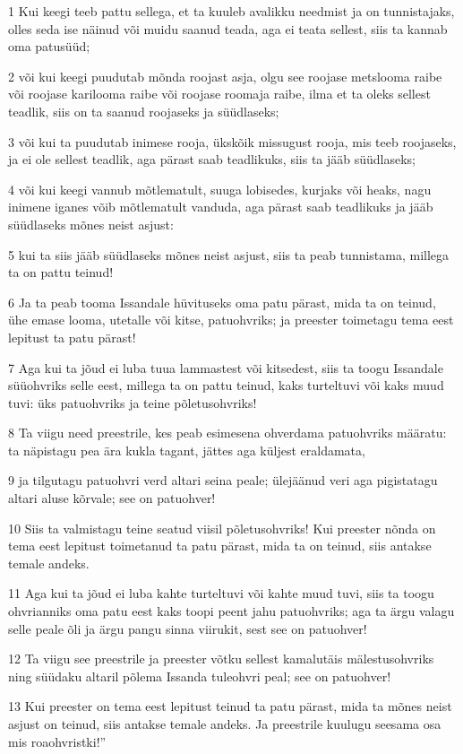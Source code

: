 \par 1 Kui keegi teeb pattu sellega, et ta kuuleb avalikku needmist ja on tunnistajaks, olles seda ise näinud või muidu saanud teada, aga ei teata sellest, siis ta kannab oma patusüüd;
\par 2 või kui keegi puudutab mõnda roojast asja, olgu see roojase metslooma raibe või roojase karilooma raibe või roojase roomaja raibe, ilma et ta oleks sellest teadlik, siis on ta saanud roojaseks ja süüdlaseks;
\par 3 või kui ta puudutab inimese rooja, ükskõik missugust rooja, mis teeb roojaseks, ja ei ole sellest teadlik, aga pärast saab teadlikuks, siis ta jääb süüdlaseks;
\par 4 või kui keegi vannub mõtlematult, suuga lobisedes, kurjaks või heaks, nagu inimene iganes võib mõtlematult vanduda, aga pärast saab teadlikuks ja jääb süüdlaseks mõnes neist asjust:
\par 5 kui ta siis jääb süüdlaseks mõnes neist asjust, siis ta peab tunnistama, millega ta on pattu teinud!
\par 6 Ja ta peab tooma Issandale hüvituseks oma patu pärast, mida ta on teinud, ühe emase looma, utetalle või kitse, patuohvriks; ja preester toimetagu tema eest lepitust ta patu pärast!
\par 7 Aga kui ta jõud ei luba tuua lammastest või kitsedest, siis ta toogu Issandale süüohvriks selle eest, millega ta on pattu teinud, kaks turteltuvi või kaks muud tuvi: üks patuohvriks ja teine põletusohvriks!
\par 8 Ta viigu need preestrile, kes peab esimesena ohverdama patuohvriks määratu: ta näpistagu pea ära kukla tagant, jättes aga küljest eraldamata,
\par 9 ja tilgutagu patuohvri verd altari seina peale; ülejäänud veri aga pigistatagu altari aluse kõrvale; see on patuohver!
\par 10 Siis ta valmistagu teine seatud viisil põletusohvriks! Kui preester nõnda on tema eest lepitust toimetanud ta patu pärast, mida ta on teinud, siis antakse temale andeks.
\par 11 Aga kui ta jõud ei luba kahte turteltuvi või kahte muud tuvi, siis ta toogu ohvrianniks oma patu eest kaks toopi peent jahu patuohvriks; aga ta ärgu valagu selle peale õli ja ärgu pangu sinna viirukit, sest see on patuohver!
\par 12 Ta viigu see preestrile ja preester võtku sellest kamalutäis mälestusohvriks ning süüdaku altaril põlema Issanda tuleohvri peal; see on patuohver!
\par 13 Kui preester on tema eest lepitust teinud ta patu pärast, mida ta mõnes neist asjust on teinud, siis antakse temale andeks. Ja preestrile kuulugu seesama osa mis roaohvristki!”
